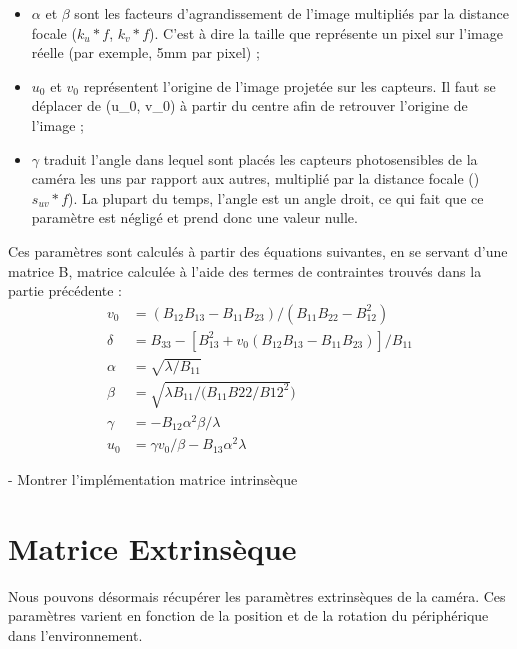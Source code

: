 \documentclass{article}
\begin{document}
\begin{itemize}
\item $\alpha$ et $\beta$ sont les facteurs d'agrandissement de l'image multipliés par la distance focale ($k_u * f$, $k_v * f$). C'est à dire la taille que représente un pixel sur l'image réelle (par exemple, 5mm par pixel) ;
\item $u_0$ et $v_0$ représentent l'origine de l'image projetée sur les capteurs. Il faut se déplacer de (u_0, v_0) à partir du centre afin de retrouver l'origine de l'image ;
\item $\gamma$ traduit l'angle dans lequel sont placés les capteurs photosensibles de la caméra les uns par rapport aux autres, multiplié par la distance focale ()$s_{uv} * f$). La plupart du temps, l'angle est un angle droit, ce qui fait que ce paramètre est négligé et prend donc une valeur nulle.
\end{itemize}

Ces paramètres sont calculés à partir des équations suivantes, en se servant d'une matrice B, matrice calculée à l'aide des termes de contraintes trouvés dans la partie précédente :
\begin{equation}
  \begin{aligned}
    v_0 &= (B_{12}B_{13} - B_{11}B_{23}) / (B_{11}B_{22} -B_{12}^2) \\
    \delta &= B_{33} - [B_{13}^2 + v_0(B_{12}B_{13} - B_{11}B_{23})] / B_{11} \\
    \alpha &= \sqrt{\lambda/B_{11}} \\
    \beta &= \sqrt{\lambda B_{11}/(B_{11}B{22}/B{12}^2}) \\
    \gamma &= -B_{12}\alpha^2\beta/\lambda \\
    u_0 &= \gamma v_0 /\beta - B_{13}\alpha^2\lambda
  \end{aligned}
\end{equation}

- Montrer l'implémentation matrice intrinsèque


\section{Matrice Extrinsèque}
Nous pouvons désormais récupérer les paramètres extrinsèques de la caméra.
Ces paramètres varient en fonction de la position et de la rotation du périphérique dans l'environnement.
\end{document}
